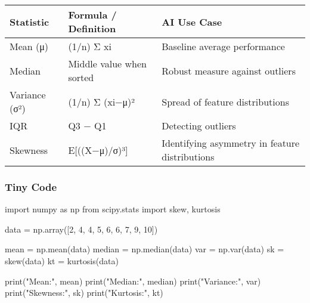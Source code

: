 \documentclass[
  letterpaper,
  DIV=11,
  numbers=noendperiod]{scrreprt}
\newenvironment{Shaded}{\begin{snugshade}}{\end{snugshade}}
\newcommand{\BuiltInTok}[1]{\textcolor[rgb]{0.00,0.23,0.31}{#1}}
\newcommand{\DecValTok}[1]{\textcolor[rgb]{0.68,0.00,0.00}{#1}}
\newcommand{\ImportTok}[1]{\textcolor[rgb]{0.00,0.46,0.62}{#1}}
\newcommand{\NormalTok}[1]{\textcolor[rgb]{0.00,0.23,0.31}{#1}}
\newcommand{\OperatorTok}[1]{\textcolor[rgb]{0.37,0.37,0.37}{#1}}
\newcommand{\StringTok}[1]{\textcolor[rgb]{0.13,0.47,0.30}{#1}}
\begin{document}
\begin{longtable}[]{@{}
  >{\raggedright\arraybackslash}p{}
  >{\raggedright\arraybackslash}p{}
  >{\raggedright\arraybackslash}p{}@{}}
\toprule\noalign{}
\begin{minipage}[b]{\linewidth}\raggedright
Statistic
\end{minipage} & \begin{minipage}[b]{\linewidth}\raggedright
Formula / Definition
\end{minipage} & \begin{minipage}[b]{\linewidth}\raggedright
AI Use Case
\end{minipage} \\
\midrule\noalign{}
\endhead
\bottomrule\noalign{}
\endlastfoot
Mean (μ) & (1/n) Σ xi & Baseline average performance \\
Median & Middle value when sorted & Robust measure against outliers \\
Variance (σ²) & (1/n) Σ (xi−μ)² & Spread of feature distributions \\
IQR & Q3 − Q1 & Detecting outliers \\
Skewness & E{[}((X−μ)/σ)³{]} & Identifying asymmetry in feature
distributions \\
\end{longtable}

\subsubsection{Tiny Code}\label{tiny-code-130}

\begin{Shaded}
\begin{Highlighting}[]
\ImportTok{import}\NormalTok{ numpy }\ImportTok{as}\NormalTok{ np}
\ImportTok{from}\NormalTok{ scipy.stats }\ImportTok{import}\NormalTok{ skew, kurtosis}

\NormalTok{data }\OperatorTok{=}\NormalTok{ np.array([}\DecValTok{2}\NormalTok{, }\DecValTok{4}\NormalTok{, }\DecValTok{4}\NormalTok{, }\DecValTok{5}\NormalTok{, }\DecValTok{6}\NormalTok{, }\DecValTok{6}\NormalTok{, }\DecValTok{7}\NormalTok{, }\DecValTok{9}\NormalTok{, }\DecValTok{10}\NormalTok{])}

\NormalTok{mean }\OperatorTok{=}\NormalTok{ np.mean(data)}
\NormalTok{median }\OperatorTok{=}\NormalTok{ np.median(data)}
\NormalTok{var }\OperatorTok{=}\NormalTok{ np.var(data)}
\NormalTok{sk }\OperatorTok{=}\NormalTok{ skew(data)}
\NormalTok{kt }\OperatorTok{=}\NormalTok{ kurtosis(data)}

\BuiltInTok{print}\NormalTok{(}\StringTok{"Mean:"}\NormalTok{, mean)}
\BuiltInTok{print}\NormalTok{(}\StringTok{"Median:"}\NormalTok{, median)}
\BuiltInTok{print}\NormalTok{(}\StringTok{"Variance:"}\NormalTok{, var)}
\BuiltInTok{print}\NormalTok{(}\StringTok{"Skewness:"}\NormalTok{, sk)}
\BuiltInTok{print}\NormalTok{(}\StringTok{"Kurtosis:"}\NormalTok{, kt)}
\end{Highlighting}
\end{Shaded}
\end{document}

